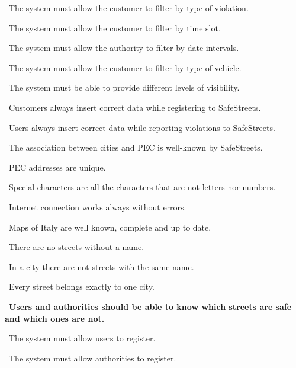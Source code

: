 \begin{description}
\begin{description}
\begin{description}
							\item {}\ The system must allow the customer to filter by type of violation.
							\item {}\ The system must allow the customer to filter by time slot.
							\item {}\ The system must allow the authority to filter by date intervals.
							\item {}\ The system must allow the customer to filter by type of vehicle.
							\item {}\ The system must be able to provide different levels of visibility.
							\item {}\ Customers always insert correct data while registering to SafeStreets.
							\item {}\ Users always insert correct data while reporting violations to SafeStreets.
							\item {}\ The association between cities and PEC is well-known by SafeStreets.
							\item {}\ PEC addresses are unique.
							\item {}\ Special characters are all the characters that are not letters nor numbers.
							\item {}\ Internet connection works always without errors.
							\item {}\ Maps of Italy are well known, complete and up to date.
							\item {}\ There are no streets without a name.
							\item {}\ In a city there are not streets with the same name.
							\item {}\ Every street belongs exactly to one city.
						\end{description}
				\end{description}
			\item {}\ \textbf{Users and authorities should be able to know which streets are safe and which ones are not.} 
				\begin{description}
					\item {}\ The system must allow users to register.
					\item {}\ The system must allow authorities to register.

\end{description}
\end{description}
